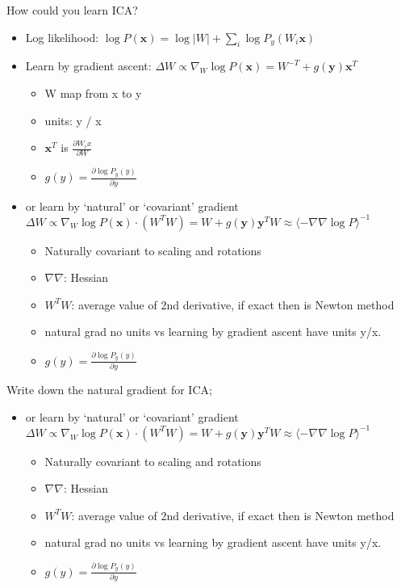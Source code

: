 \documentclass{article}
\begin{document}
How could you learn ICA? \begin{itemize}
    \item Log likelihood: $\log P(\mathbf{x})=\log|W|+\sum_i \log P_y(W_i\mathbf{x})$ 
    \item Learn by gradient ascent: $\Delta W\propto \nabla_W\log P(\mathbf{x}) = W^{-T}+g(\mathbf{y})\mathbf{x}^T$
    \begin{itemize}
        \item W map from x to y
        \item units: y / x
        \item $\mathbf{x}^T$ is $\frac{\partial W_ix}{\partial W}$
        \item $g(y)=\frac{\partial \log P_y(y)}{\partial y}$
    \end{itemize}
    \item or learn by `natural' or `covariant' gradient $\Delta W\propto \nabla_W\log P(\mathbf{x})\cdot (W^TW) = W + g(\mathbf{y})\mathbf{y}^TW \approx \langle -\nabla\nabla\log P\rangle^{-1}$
    \begin{itemize}
        \item Naturally covariant to scaling and rotations
        \item $\nabla\nabla$: Hessian
        \item $W^TW$: average value of 2nd derivative, if exact then is Newton method
        \item natural grad no units vs learning by gradient ascent have units y/x.
        \item $g(y)=\frac{\partial \log P_y(y)}{\partial y}$
    \end{itemize}
\end{itemize}

Write down the natural gradient for ICA; \begin{itemize}
    \item or learn by `natural' or `covariant' gradient $\Delta W\propto \nabla_W\log P(\mathbf{x})\cdot (W^TW) = W + g(\mathbf{y})\mathbf{y}^TW \approx \langle -\nabla\nabla\log P\rangle^{-1}$
    \begin{itemize}
        \item Naturally covariant to scaling and rotations
        \item $\nabla\nabla$: Hessian
        \item $W^TW$: average value of 2nd derivative, if exact then is Newton method
        \item natural grad no units vs learning by gradient ascent have units y/x.
        \item $g(y)=\frac{\partial \log P_y(y)}{\partial y}$
    \end{itemize}
\end{itemize}
\end{document}
